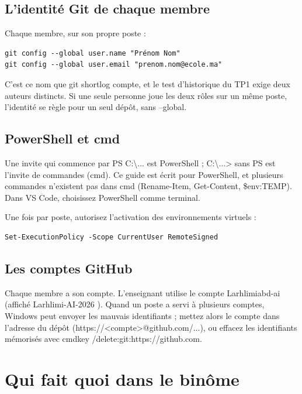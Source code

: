 \documentclass[11pt,a4paper]{article}
\newcommand{\co}[1]{{\ttfamily\hyphenchar\font=45\relax #1}}
\newcommand{\bs}{\textbackslash\allowbreak{}}
\begin{document}
\subsection{L'identité Git de chaque membre}

Chaque membre, sur son propre poste :

\begin{lstlisting}
git config --global user.name "Prénom Nom"
git config --global user.email "prenom.nom@ecole.ma"
\end{lstlisting}

C'est ce nom que \co{git shortlog} compte, et le test d'historique du TP1 exige deux auteurs distincts. Si
une seule personne joue les deux rôles sur un même poste, l'identité se règle pour un seul dépôt, sans
\co{--global}.

\subsection{PowerShell et cmd}

Une invite qui commence par \co{PS C:\bs...} est PowerShell ; \co{C:\bs...>} sans \co{PS} est l'invite de
commandes (cmd). Ce guide est écrit pour PowerShell, et plusieurs commandes n'existent pas dans cmd
(\co{Rename-Item}, \co{Get-Content}, \co{\$env:TEMP}). Dans VS Code, choisissez PowerShell comme terminal.

Une fois par poste, autorisez l'activation des environnements virtuels :

\begin{lstlisting}
Set-ExecutionPolicy -Scope CurrentUser RemoteSigned
\end{lstlisting}

\subsection{Les comptes GitHub}

Chaque membre a son compte. L'enseignant utilise le compte \co{Larhlimiabd-ai} (affiché
\og Larhlimi-AI-2026 \fg{}). Quand un poste a servi à plusieurs comptes, Windows peut envoyer les mauvais
identifiants ; mettez alors le compte dans l'adresse du dépôt
(\co{https://<compte>@github.com/...}), ou effacez les identifiants mémorisés avec
\co{cmdkey /delete:git:https://github.com}.

\section{Qui fait quoi dans le binôme}
\end{document}

